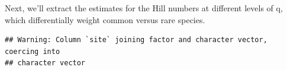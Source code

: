\documentclass[]{article}
\newenvironment{Shaded}{\begin{snugshade}}{\end{snugshade}}
\newcommand{\DataTypeTok}[1]{\textcolor[rgb]{0.13,0.29,0.53}{#1}}
\newcommand{\KeywordTok}[1]{\textcolor[rgb]{0.13,0.29,0.53}{\textbf{#1}}}
\newcommand{\NormalTok}[1]{#1}
\newcommand{\OperatorTok}[1]{\textcolor[rgb]{0.81,0.36,0.00}{\textbf{#1}}}
\newcommand{\StringTok}[1]{\textcolor[rgb]{0.31,0.60,0.02}{#1}}
\begin{document}
Next, we'll extract the estimates for the Hill numbers at different
levels of q, which differentially weight common versus rare species.

\begin{Shaded}
\end{Shaded}

\begin{verbatim}
## Warning: Column `site` joining factor and character vector, coercing into
## character vector
\end{verbatim}
\end{document}
